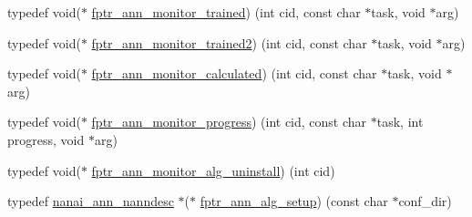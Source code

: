 \begin{DoxyCompactItemize}
\item 
typedef void($\ast$ \hyperlink{namespacenanai_adb209ab120b98e800db2b0c8621cd488}{fptr\+\_\+ann\+\_\+monitor\+\_\+trained}) (int cid, const char $\ast$task, void $\ast$arg)
\item 
typedef void($\ast$ \hyperlink{namespacenanai_a598e872bf861dac8080e98d6d155b3b5}{fptr\+\_\+ann\+\_\+monitor\+\_\+trained2}) (int cid, const char $\ast$task, void $\ast$arg)
\item 
typedef void($\ast$ \hyperlink{namespacenanai_afc00080af95a1dc2349880f03d7d6a88}{fptr\+\_\+ann\+\_\+monitor\+\_\+calculated}) (int cid, const char $\ast$task, void $\ast$arg)
\item 
typedef void($\ast$ \hyperlink{namespacenanai_a5c9964edbd4db8ae35df7cd024020e87}{fptr\+\_\+ann\+\_\+monitor\+\_\+progress}) (int cid, const char $\ast$task, int progress, void $\ast$arg)
\item 
typedef void($\ast$ \hyperlink{namespacenanai_a04b231ce428a771ab1a9aace53be65c6}{fptr\+\_\+ann\+\_\+monitor\+\_\+alg\+\_\+uninstall}) (int cid)
\item 
typedef \hyperlink{namespacenanai_a892a8c80381d0005a076b68fbbf2d918}{nanai\+\_\+ann\+\_\+nanndesc} $\ast$($\ast$ \hyperlink{namespacenanai_af358544d3d83ecb56361b1eaa46a0e98}{fptr\+\_\+ann\+\_\+alg\+\_\+setup}) (const char $\ast$conf\+\_\+dir)
\end{DoxyCompactItemize}

